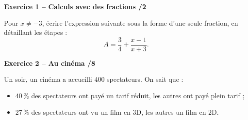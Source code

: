 \documentclass[10pt,a4paper]{article}
\begin{document}

\textbf{Exercice 1 -- Calculs avec des fractions \hfill /2}

Pour \(x\neq-3\), écrire l'expression suivante sous la forme d'une seule fraction, en détaillant les étapes :
\[
A=\dfrac{3}{4}+\dfrac{x-1}{x+3}.
\]

\vspace{2.3cm}

\textbf{Exercice 2 -- Au cinéma \hfill /8}

Un soir, un cinéma a accueilli \(400\) spectateurs. On sait que :
\begin{itemize}
\item \(40\,\%\) des spectateurs ont payé un tarif réduit, les autres ont payé plein tarif ;
\item \(27\,\%\) des spectateurs ont vu un film en 3D, les autres un film en 2D.
\end{itemize}
\end{document}
